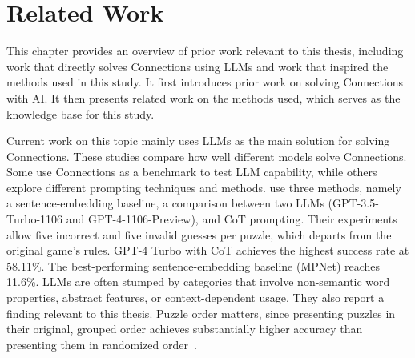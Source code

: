 
\chapter{Related Work}
\label{chap:related_work}

This chapter provides an overview of prior work relevant to this thesis, including work that directly solves Connections using LLMs and work that inspired the methods used in this study. It first introduces prior work on solving Connections with AI. It then presents related work on the methods used, which serves as the knowledge base for this study.

\label{sec:prior-work-connections}

Current work on this topic mainly uses LLMs as the main solution for solving Connections. These studies compare how well different models solve Connections. Some use Connections as a benchmark to test LLM capability, while others explore different prompting techniques and methods. \citeauthor{toddMissedConnectionsLateral2024} use three methods, namely a sentence-embedding baseline, a comparison between two LLMs (GPT-3.5-Turbo-1106 and GPT-4-1106-Preview), and \ac{CoT} prompting. Their experiments allow five incorrect and five invalid guesses per puzzle, which departs from the original game's rules. GPT-4 Turbo with \ac{CoT} achieves the highest success rate at 58.11\%. The best-performing sentence-embedding baseline (MPNet) reaches 11.6\%. LLMs are often stumped by categories that involve non-semantic word properties, abstract features, or context-dependent usage. They also report a finding relevant to this thesis. Puzzle order matters, since presenting puzzles in their original, grouped order achieves substantially higher accuracy than presenting them in randomized order~\cite{toddMissedConnectionsLateral2024}.


